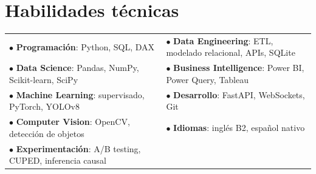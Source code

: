 \documentclass[letterpaper,10pt]{article}
\begin{document}
\section*{Habilidades técnicas}

\noindent
\begin{tabularx}{\linewidth}{@{}X X@{}}
$\bullet$ \textbf{Programación}: Python, SQL, DAX & $\bullet$ \textbf{Data Engineering}: ETL, modelado relacional, APIs, SQLite \\
$\bullet$ \textbf{Data Science}: Pandas, NumPy, Scikit-learn, SciPy & $\bullet$ \textbf{Business Intelligence}: Power BI, Power Query, Tableau \\
$\bullet$ \textbf{Machine Learning}: supervisado, PyTorch, YOLOv8 & $\bullet$ \textbf{Desarrollo}: FastAPI, WebSockets, Git \\
$\bullet$ \textbf{Computer Vision}: OpenCV, detección de objetos & $\bullet$ \textbf{Idiomas}: inglés B2, español nativo \\
$\bullet$ \textbf{Experimentación}: A/B testing, CUPED, inferencia causal & \\
\end{tabularx}
\end{document}
